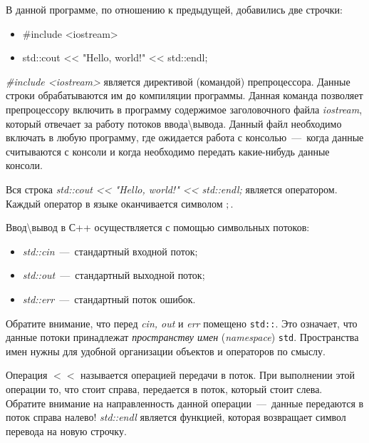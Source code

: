 В данной программе, по отношению к предыдущей, добавились две строчки:

\begin{itemize}
    \item \#include <iostream>
    \item std::cout << "Hello, world!" << std::endl;
\end{itemize}

\textit{\#include <iostream>} является директивой (командой) препроцессора. Данные строки обрабатываются им \texttt{до} компиляции программы. Данная команда позволяет препроцессору включить в программу содержимое заголовочного файла \textit{iostream}, который отвечает за работу потоков ввода\textbackslash вывода. Данный файл необходимо включать в любую программу, где ожидается работа с консолью~---~когда данные считываются с консоли и когда необходимо передать какие-нибудь данные консоли.

Вся строка \textit{std::cout << "Hello, world!" << std::endl;} является оператором. Каждый оператор в языке оканчивается символом $;$.

Ввод\textbackslash вывод в С++ осуществляется с помощью символьных потоков:
\begin{itemize}
    \item \textit{std::cin}~---~стандартный входной поток;
    \item \textit{std::out}~---~стандартный выходной поток;
    \item \textit{std::err}~---~стандартный поток ошибок.
\end{itemize}

Обратите внимание, что перед \textit{cin, out} и \textit{err} помещено \texttt{std::}. Это означает, что данные потоки принадлежат \textit{пространству имен} (\textit{namespace}) \texttt{std}. Пространства имен нужны для удобной организации объектов и операторов по смыслу.

Операция $<<$ называется $\textit{операцией передачи в поток}$. При выполнении этой операции то, что стоит справа, передается в поток, который стоит слева. Обратите внимание на направленность данной операции~---~данные передаются в поток справа налево! \textit{std::endl} является функцией, которая возвращает символ перевода на новую строчку.


